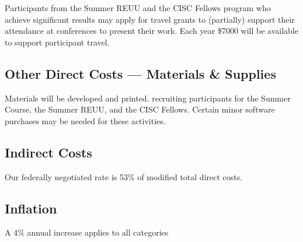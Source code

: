 \documentclass[11pt]{NSFamsart}
\begin{document}
Participants from the Summer REUU and the CISC Fellows program who achieve significant results may apply for travel grants to (partially) support their attendance at conferences to present their work.  Each year \$7000 will be available to support participant travel.



\subsection*{Other Direct Costs --- Materials \& Supplies}
Materials will be developed and printed. recruiting participants for the Summer Course, the Summer REUU, and the CISC Fellows.  Certain minor software purchases may be needed for these activities.

\subsection*{Indirect Costs}
Our federally negotiated rate is 53\% of modified total direct costs.


\subsection*{Inflation}A 4\% annual increase applies to all categories
\end{document}
